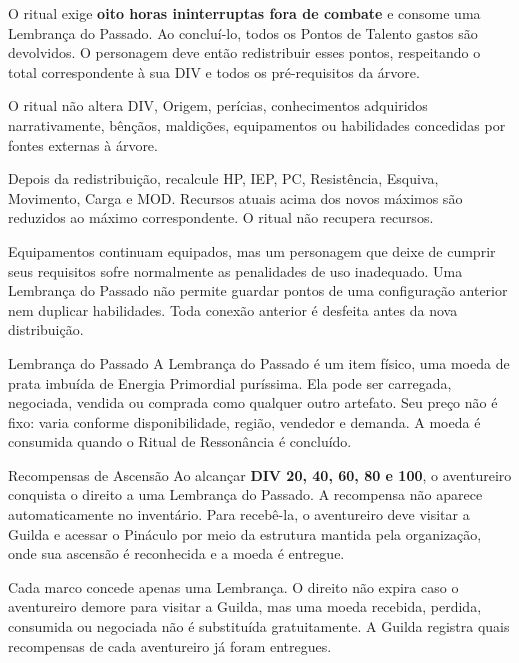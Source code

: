 O ritual exige \textbf{oito horas ininterruptas fora de combate} e consome uma Lembrança do Passado. Ao concluí-lo, todos os Pontos de Talento gastos são devolvidos. O personagem deve então redistribuir esses pontos, respeitando o total correspondente à sua DIV e todos os pré-requisitos da árvore.

O ritual não altera DIV, Origem, perícias, conhecimentos adquiridos narrativamente, bênçãos, maldições, equipamentos ou habilidades concedidas por fontes externas à árvore.

Depois da redistribuição, recalcule HP, IEP, PC, Resistência, Esquiva, Movimento, Carga e MOD. Recursos atuais acima dos novos máximos são reduzidos ao máximo correspondente. O ritual não recupera recursos.

Equipamentos continuam equipados, mas um personagem que deixe de cumprir seus requisitos sofre normalmente as penalidades de uso inadequado. Uma Lembrança do Passado não permite guardar pontos de uma configuração anterior nem duplicar habilidades. Toda conexão anterior é desfeita antes da nova distribuição.

\begin{rpgboxtips}{Lembrança do Passado}
A Lembrança do Passado é um item físico, uma moeda de prata imbuída de Energia Primordial puríssima. Ela pode ser carregada, negociada, vendida ou comprada como qualquer outro artefato. Seu preço não é fixo: varia conforme disponibilidade, região, vendedor e demanda. A moeda é consumida quando o Ritual de Ressonância é concluído.
\end{rpgboxtips}

\begin{rpgboxtips}{Recompensas de Ascensão}
Ao alcançar \textbf{DIV 20, 40, 60, 80 e 100}, o aventureiro conquista o direito a uma Lembrança do Passado. A recompensa não aparece automaticamente no inventário. Para recebê-la, o aventureiro deve visitar a Guilda e acessar o Pináculo por meio da estrutura mantida pela organização, onde sua ascensão é reconhecida e a moeda é entregue.

Cada marco concede apenas uma Lembrança. O direito não expira caso o aventureiro demore para visitar a Guilda, mas uma moeda recebida, perdida, consumida ou negociada não é substituída gratuitamente. A Guilda registra quais recompensas de cada aventureiro já foram entregues.
\end{rpgboxtips}




